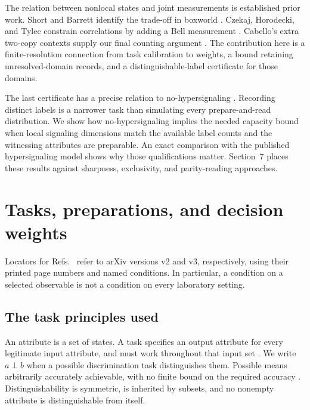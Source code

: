 \documentclass[a4paper,11pt,twocolumn,unpublished]{quantumarticle}
\begin{document}
The relation between nonlocal states and joint measurements is established prior work. Short and Barrett identify the trade-off in boxworld \cite{short}. Czekaj, Horodecki, and Tylec constrain correlations by adding a Bell measurement \cite{czekaj}. Cabello's extra two-copy contexts supply our final counting argument \cite{cabello}. The contribution here is a finite-resolution connection from task calibration to weights, a bound retaining unresolved-domain records, and a distinguishable-label certificate for those domains.

The last certificate has a precise relation to no-hypersignaling \cite{hs}. Recording distinct labels is a narrower task than simulating every prepare-and-read distribution. We show how no-hypersignaling implies the needed capacity bound when local signaling dimensions match the available label counts and the witnessing attributes are preparable. An exact comparison with the published hypersignaling model shows why those qualifications matter. Section~7 places these results against sharpness, exclusivity, and parity-reading approaches.

\section{Tasks, preparations, and decision weights}
Locators for Refs.~\cite{cti,ctp} refer to arXiv versions v2 and v3, respectively, using their printed page numbers and named conditions. In particular, a condition on a selected observable is not a condition on every laboratory setting.

\subsection{The task principles used}
An attribute is a set of states. A task specifies an output attribute for every legitimate input attribute, and must work throughout that input set \cite[Sec.~2, pp.~8--11]{ctp}. We write $a\perp b$ when a possible discrimination task distinguishes them. Possible means arbitrarily accurately achievable, with no finite bound on the required accuracy \cite[Sec.~2, p.~8]{cti}. Distinguishability is symmetric, is inherited by subsets, and no nonempty attribute is distinguishable from itself.
\end{document}
